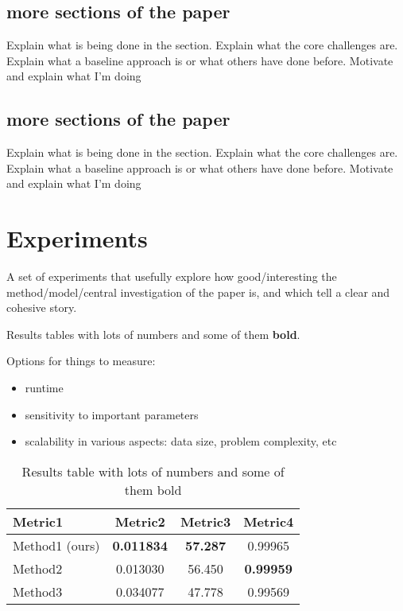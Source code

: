 \documentclass{article}
\begin{document}
\subsection{more sections of the paper}
Explain what is being done in the section. Explain what the core challenges are. Explain what a baseline approach is or what others have done before. Motivate and explain what I'm doing

\subsection{more sections of the paper}
Explain what is being done in the section. Explain what the core challenges are. Explain what a baseline approach is or what others have done before. Motivate and explain what I'm doing


\section{Experiments}
\label{experiments}

A set of experiments that usefully explore how good/interesting the method/model/central investigation of the paper is, and which tell a clear and cohesive story.

Results tables with lots of numbers and some of them \textbf{bold}.

Options for things to measure:
\begin{itemize}
    \item runtime
    \item sensitivity to important parameters
    \item scalability in various aspects: data size, problem complexity, etc
\end{itemize}

\begin{table}[ht]
\label{table:reconstruction_table}
\centering
\begin{tabular}{lccc}
\hline
Metric1 & Metric2 & Metric3 & Metric4 \\
\hline
Method1 (ours) & \textbf{0.011834} & \textbf{57.287} & 0.99965 \\
Method2 & 0.013030 & 56.450 & \textbf{0.99959} \\
Method3 & 0.034077 & 47.778 & 0.99569 \\
\end{tabular}
\caption{Results table with lots of numbers and some of them bold}
\end{table}
\end{document}

